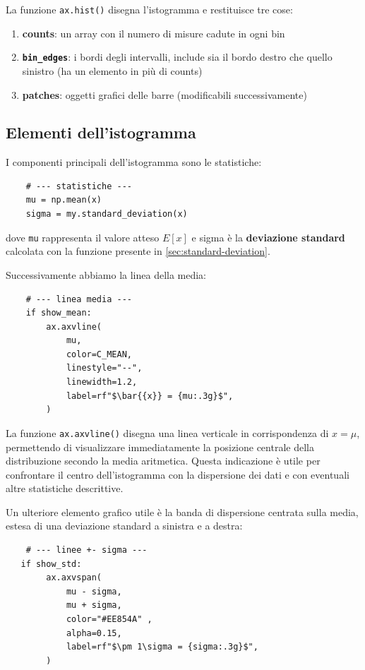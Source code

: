 La funzione \texttt{ax.hist()} disegna l'istogramma e restituisce tre cose:
\begin{enumerate}
    \item \textbf{counts}: un array con il numero di misure cadute in ogni bin
    \item \textbf{\texttt{bin\_edges}}: i bordi degli intervalli, include sia il bordo destro che quello sinistro (ha un elemento in più di counts)
    \item \textbf{patches}: oggetti grafici delle barre (modificabili successivamente)
\end{enumerate}

\subsection{Elementi dell'istogramma}
I componenti principali dell'istogramma sono le statistiche:
\begin{verbatim}
    # --- statistiche ---
    mu = np.mean(x)
    sigma = my.standard_deviation(x)
\end{verbatim}
dove \texttt{mu} rappresenta il valore atteso $E[x]$ e sigma è la \textbf{deviazione standard} calcolata con la funzione presente in \ref{sec:standard-deviation}.

Successivamente abbiamo la linea della media:
\begin{verbatim}
    # --- linea media ---
    if show_mean:
        ax.axvline(
            mu,
            color=C_MEAN,
            linestyle="--",
            linewidth=1.2,
            label=rf"$\bar{{x}} = {mu:.3g}$",
        )
\end{verbatim}
La funzione \texttt{ax.axvline()} disegna una linea verticale in
corrispondenza di \(x=\mu\), permettendo di visualizzare immediatamente
la posizione centrale della distribuzione secondo la media aritmetica.
Questa indicazione è utile per confrontare il centro dell'istogramma con
la dispersione dei dati e con eventuali altre statistiche descrittive.

Un ulteriore elemento grafico utile è la banda di dispersione centrata
sulla media, estesa di una deviazione standard a sinistra e a destra:

\begin{verbatim}
    # --- linee +- sigma ---
   if show_std:
        ax.axvspan(
            mu - sigma,
            mu + sigma,
            color="#EE854A" ,
            alpha=0.15,
            label=rf"$\pm 1\sigma = {sigma:.3g}$",
        )
\end{verbatim}


